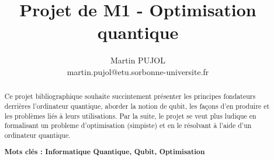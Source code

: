 \documentclass{article}
\begin{document}
\title{Projet de M1 - Optimisation quantique}
\author{Martin PUJOL \\ martin.pujol@etu.sorbonne-universite.fr}
\date{}

\maketitle
\thispagestyle{fancy}

\begin{abstract}

Ce projet bibliographique souhaite succintement présenter les principes fondateurs derrières l'ordinateur quantique, aborder la notion de qubit, les façons d'en produire et les problèmes liés à leurs utilisations.
Par la suite, le projet se veut plus ludique en formalisant un probleme d'optimisation (simpiste) et en le résolvant à l'aide d'un ordinateur quantique.

\textbf{Mots clés : Informatique Quantique, Qubit, Optimisation } 

\end{abstract}
\end{document}
